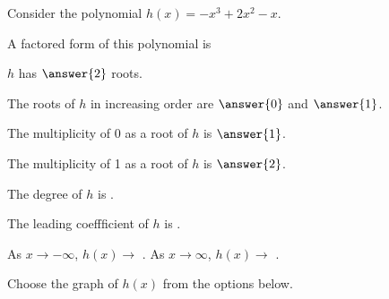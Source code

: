 \documentclass{ximera}
\author{Kenneth Berglund}
\begin{document}
Consider the polynomial $h(x) = -x^3 + 2x^2 - x$. 

\begin{exercise}
A factored form of this polynomial is 
\begin{multipleChoice}
\end{multipleChoice}

\begin{exercise}
$h$ has $\answer{2}$ roots.

\begin{exercise}
The roots of $h$ in increasing order are $\answer{0}$ and $\answer{1}$.

\begin{exercise}
The multiplicity of 0 as a root of $h$ is $\answer{1}$. 

The multiplicity of 1 as a root of $h$ is $\answer{2}$. 

\begin{exercise}
The degree of $h$ is .

The leading coeffficient of $h$ is .

As $x \to -\infty$, $h(x) \to$ \wordChoice{\choice[correct]{$\infty$}\choice{$-\infty$}}. As $x \to \infty$, $h(x) \to$ \wordChoice{\choice{$\infty$}\choice[correct]{$-\infty$}}.

\begin{exercise}
Choose the graph of $h(x)$ from the options below.

\begin{image}
\end{image} 


\end{exercise}
\end{exercise}
\end{exercise}
\end{exercise}
\end{exercise}
\end{exercise}
\end{document}
